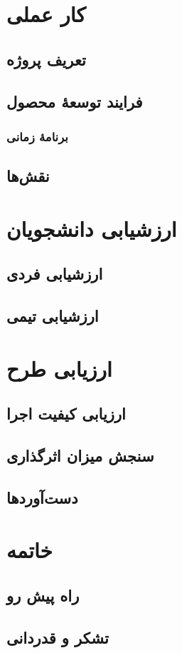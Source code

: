 \documentclass[a4paper,notitlepage]{report}
\begin{document}
\chapter{کار عملی}
\section{تعریف پروژه}
\section{فرایند توسعهٔ محصول}
\subsection{برنامهٔ زمانی}
\section{نقش‌ها}
\chapter{ارزشیابی دانشجویان}
\section{ارزشیابی فردی}
\section{ارزشیابی تیمی}
\chapter{ارزیابی طرح}
\section{ارزیابی کیفیت اجرا} 
\section{سنجش میزان اثرگذاری}
\section{دست‌آوردها}
\chapter{خاتمه}
\section{راه پیش رو}
\section{تشکر و قدردانی}
\end{document}
